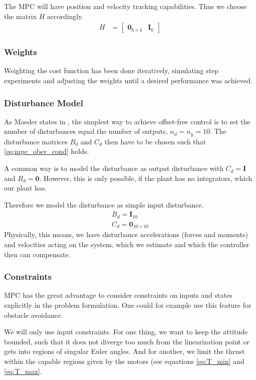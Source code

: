 The MPC will have position and velocity tracking capabilities. Thus we choose the matrix $H$ accordingly.
\begin{align}
H &= \begin{bmatrix}
\mathbf{0}_{6\times4} & \mathbf{I}_6 
\end{bmatrix} 
\end{align}
\subsubsection{Weights}
Weighting the cost function has been done iteratively, simulating step experiments and adjusting the weights until a desired performance was achieved.
\subsubsection{Disturbance Model}
As Maeder states in \cite{Maeder2009}, the simplest way to achieve offset-free control is to set the number of disturbances equal the number of outputs, $n_d=n_y=10$. The disturbance matrices $B_d$ and $C_d$ then have to be chosen such that \ref{eq:mpc_obsv_cond} holds.

A common way is to model the disturbance as output disturbance with $C_d=\mathbf{I}$ and $B_d= \mathbf{0}$. However, this is only possible, if the plant has no integrators, which our plant has.

Therefore we model the disturbance as simple input disturbance.
\begin{align}
B_d = \mathbf{I}_{10} \\
C_d = \mathbf{0}_{10\times10}
\end{align}
Physically, this means, we have disturbance accelerations (forces and moments) and velocities acting on the system, which we estimate and which the controller then can compensate.
\subsubsection{Constraints}
MPC has the great advantage to consider constraints on inputs and states explicitly in the problem formulation. One could for example use this feature for obstacle avoidance.

We will only use input constraints. For one thing, we want to keep the attitude bounded, such that it does not diverge too much from the linearization point or gets into regions of singular Euler angles. And for another, we limit the thrust within the capable regions given by the motors (see equations \ref{eq:T_min} and \ref{eq:T_max}.

